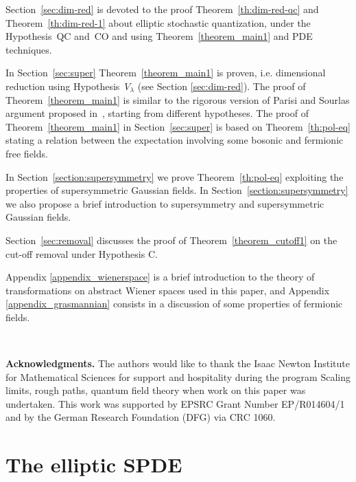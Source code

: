 \documentclass[a4paper,10pt]{article}
\newcommand{\tmtextbf}[1]{{\bfseries{#1}}}
\begin{document}
Section~\ref{sec:dim-red} is devoted to the proof Theorem~\ref{th:dim-red-qc}
and Theorem~\ref{th:dim-red-1} about elliptic stochastic quantization, under
the Hypothesis~QC and~CO and using Theorem~\ref{theorem_main1} and PDE
techniques.

In Section~\ref{sec:super} Theorem~\ref{theorem_main1} is proven, i.e.
dimensional reduction using Hypothesis~$V_{\lambda}$ (see Section
\ref{sec:dim-red}). The proof of Theorem~\ref{theorem_main1} is similar to the
rigorous version of Parisi and Sourlas argument proposed in~{\cite{Klein1984}},
starting from different hypotheses. The proof of  Theorem~\ref{theorem_main1} in Section~\ref{sec:super} is
based on Theorem~\ref{th:pol-eq} stating a relation between the expectation
involving some bosonic and fermionic free fields.

In Section~\ref{section:supersymmetry} we prove Theorem~\ref{th:pol-eq}
exploiting the properties of supersymmetric Gaussian fields. In
Section~\ref{section:supersymmetry} we also propose a brief introduction to
supersymmetry and supersymmetric Gaussian fields.

Section~\ref{sec:removal} discusses the proof of
Theorem~\ref{theorem_cutoff1} on the cut-off removal under Hypothesis C.

Appendix \ref{appendix_wienerspace} is a brief introduction to the theory of
transformations on abstract Wiener spaces used in this paper, and Appendix
\ref{appendix_grasmannian} consists in a discussion of some properties of
fermionic fields.

\

{\noindent}\tmtextbf{Acknowledgments.} The authors would like to thank the
Isaac Newton Institute for Mathematical Sciences for support and hospitality
during the program Scaling limits, rough paths, quantum field theory when work
on this paper was undertaken. This work was supported by EPSRC Grant Number
EP/R014604/1 and by the German Research Foundation (DFG) via CRC 1060.

\section{The elliptic SPDE}\label{sec:solutions}
\end{document}
